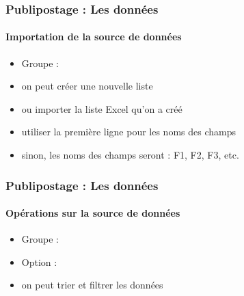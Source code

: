 \documentclass[xcolor=table]{beamer}
\begin{document}
\begin{frame}
\frametitle{Publipostage : Les données}
\framesubtitle{Importation de la source de données}

\begin{minipage}{0.40\textwidth}
	\begin{itemize}
		\item Groupe : 
		\item on peut créer une nouvelle liste
		\item ou importer la liste Excel qu'on a créé
		\item utiliser la première ligne pour les noms des champs
		\item sinon, les noms des champs seront : F1, F2, F3, etc.
	\end{itemize}
\end{minipage}
\begin{minipage}{0.59\textwidth}
	
\end{minipage}

\end{frame}

\begin{frame}
\frametitle{Publipostage : Les données}
\framesubtitle{Opérations sur la source de données}

\begin{minipage}{0.53\textwidth}
	\begin{itemize}
		\item Groupe : 
		\item Option : 
		\item on peut trier et filtrer les données
	\end{itemize}
\end{minipage}
\begin{minipage}{0.45\textwidth}
\end{minipage}


\end{frame}
\end{document}
